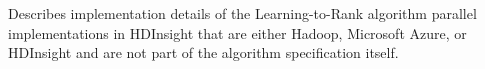Describes implementation details of the Learning-to-Rank algorithm parallel implementations in HDInsight that are either Hadoop, Microsoft Azure, or HDInsight and are not part of the algorithm specification itself.